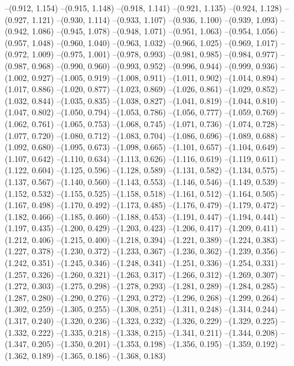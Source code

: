 {--(0.912, 1.154)
--(0.915, 1.148)
--(0.918, 1.141)
--(0.921, 1.135)
--(0.924, 1.128)
--(0.927, 1.121)
--(0.930, 1.114)
--(0.933, 1.107)
--(0.936, 1.100)
--(0.939, 1.093)
--(0.942, 1.086)
--(0.945, 1.078)
--(0.948, 1.071)
--(0.951, 1.063)
--(0.954, 1.056)
--(0.957, 1.048)
--(0.960, 1.040)
--(0.963, 1.032)
--(0.966, 1.025)
--(0.969, 1.017)
--(0.972, 1.009)
--(0.975, 1.001)
--(0.978, 0.993)
--(0.981, 0.985)
--(0.984, 0.977)
--(0.987, 0.968)
--(0.990, 0.960)
--(0.993, 0.952)
--(0.996, 0.944)
--(0.999, 0.936)
--(1.002, 0.927)
--(1.005, 0.919)
--(1.008, 0.911)
--(1.011, 0.902)
--(1.014, 0.894)
--(1.017, 0.886)
--(1.020, 0.877)
--(1.023, 0.869)
--(1.026, 0.861)
--(1.029, 0.852)
--(1.032, 0.844)
--(1.035, 0.835)
--(1.038, 0.827)
--(1.041, 0.819)
--(1.044, 0.810)
--(1.047, 0.802)
--(1.050, 0.794)
--(1.053, 0.786)
--(1.056, 0.777)
--(1.059, 0.769)
--(1.062, 0.761)
--(1.065, 0.753)
--(1.068, 0.745)
--(1.071, 0.736)
--(1.074, 0.728)
--(1.077, 0.720)
--(1.080, 0.712)
--(1.083, 0.704)
--(1.086, 0.696)
--(1.089, 0.688)
--(1.092, 0.680)
--(1.095, 0.673)
--(1.098, 0.665)
--(1.101, 0.657)
--(1.104, 0.649)
--(1.107, 0.642)
--(1.110, 0.634)
--(1.113, 0.626)
--(1.116, 0.619)
--(1.119, 0.611)
--(1.122, 0.604)
--(1.125, 0.596)
--(1.128, 0.589)
--(1.131, 0.582)
--(1.134, 0.575)
--(1.137, 0.567)
--(1.140, 0.560)
--(1.143, 0.553)
--(1.146, 0.546)
--(1.149, 0.539)
--(1.152, 0.532)
--(1.155, 0.525)
--(1.158, 0.518)
--(1.161, 0.512)
--(1.164, 0.505)
--(1.167, 0.498)
--(1.170, 0.492)
--(1.173, 0.485)
--(1.176, 0.479)
--(1.179, 0.472)
--(1.182, 0.466)
--(1.185, 0.460)
--(1.188, 0.453)
--(1.191, 0.447)
--(1.194, 0.441)
--(1.197, 0.435)
--(1.200, 0.429)
--(1.203, 0.423)
--(1.206, 0.417)
--(1.209, 0.411)
--(1.212, 0.406)
--(1.215, 0.400)
--(1.218, 0.394)
--(1.221, 0.389)
--(1.224, 0.383)
--(1.227, 0.378)
--(1.230, 0.372)
--(1.233, 0.367)
--(1.236, 0.362)
--(1.239, 0.356)
--(1.242, 0.351)
--(1.245, 0.346)
--(1.248, 0.341)
--(1.251, 0.336)
--(1.254, 0.331)
--(1.257, 0.326)
--(1.260, 0.321)
--(1.263, 0.317)
--(1.266, 0.312)
--(1.269, 0.307)
--(1.272, 0.303)
--(1.275, 0.298)
--(1.278, 0.293)
--(1.281, 0.289)
--(1.284, 0.285)
--(1.287, 0.280)
--(1.290, 0.276)
--(1.293, 0.272)
--(1.296, 0.268)
--(1.299, 0.264)
--(1.302, 0.259)
--(1.305, 0.255)
--(1.308, 0.251)
--(1.311, 0.248)
--(1.314, 0.244)
--(1.317, 0.240)
--(1.320, 0.236)
--(1.323, 0.232)
--(1.326, 0.229)
--(1.329, 0.225)
--(1.332, 0.222)
--(1.335, 0.218)
--(1.338, 0.215)
--(1.341, 0.211)
--(1.344, 0.208)
--(1.347, 0.205)
--(1.350, 0.201)
--(1.353, 0.198)
--(1.356, 0.195)
--(1.359, 0.192)
--(1.362, 0.189)
--(1.365, 0.186)
--(1.368, 0.183)
}

